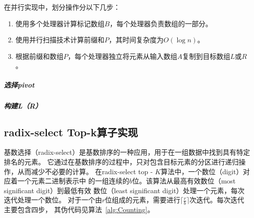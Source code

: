 在并行实现中，划分操作分以下几步：
\begin{enumerate}
    \item 使用多个处理器计算标记数组\(B\)，每个处理器负责数组的一部分。
    \item 使用并行扫描技术计算前缀和\(P\)，其时间复杂度为\(O(\log n)\)。
    \item 根据前缀和数组\(P\)，每个处理器独立将元素从输入数组\(A\)复制到目标数组\(L\)或\(R\)。
\end{enumerate}
     
\subparagraph{选择pivot}


\subparagraph{构建L（R）}


\subsection{radix-select Top-k算子实现}
基数选择（radix-select）是基数排序的一种应用，用于在一组数据中找到具有特定排名的元素。
它通过在基数排序的过程中，只对包含目标元素的分区进行递归操作，从而减少不必要的计算。
在radix-select top - \(K\)算法中，一个数位（digit）对应着一个元素二进制表示中
的一组连续的\(b\)位。该算法从最高有效数位（most significant digit）到最低有效
数位（least significant digit）处理一个元素，每次迭代处理一个数位。
对于一个由\(r\)位组成的元素，需要进行\(\lceil\frac{r}{b}\rceil\)次迭代。每次迭代主要包含四步，
其伪代码见算法~\ref{alg:Counting}。

